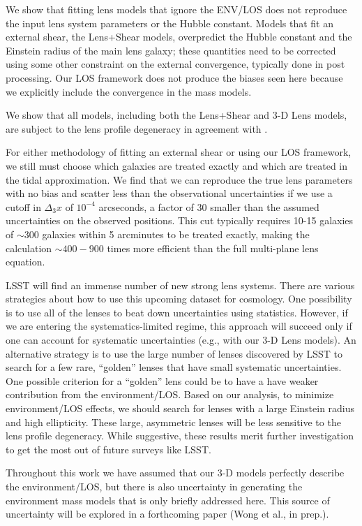 \documentclass{emulateapj}
\begin{document}
We show that fitting lens models that ignore the ENV/LOS does not reproduce the input lens system parameters or the Hubble constant. Models that fit an external shear, the Lens+Shear models, overpredict the Hubble constant and the Einstein radius of the main lens galaxy; these quantities need to be corrected using some other constraint on the external convergence, typically done in post processing. Our LOS framework does not produce the biases seen here because we explicitly include the convergence in the mass models.

We show that all models, including both the Lens+Shear and 3-D Lens models, are subject to the lens profile degeneracy in agreement with \citet{Xu15,Schneider13}. 

For either methodology of fitting an external shear or using our LOS framework, we still must choose which galaxies are treated exactly and which are treated in the tidal approximation. We find that we can reproduce the true lens parameters with no bias and scatter less than the observational uncertainties if we use a cutoff in $\Delta_3 x$ of $10^{-4}$ arcseconds, a factor of 30 smaller than the assumed uncertainties on the observed positions. This cut typically requires 10-15 galaxies of $\sim 300$ galaxies within 5 arcminutes to be treated exactly, making the calculation $\sim 400-900$ times more efficient than the full multi-plane lens equation.

LSST will find an immense number of new strong lens systems. There are various strategies about how to use this upcoming dataset for cosmology. One possibility is to use all of the lenses to beat down uncertainties using statistics. However, if we are entering the systematics-limited regime, this approach will succeed only if one can account for systematic uncertainties (e.g., with our 3-D Lens models). An alternative strategy is to use the large number of lenses discovered by LSST to search for a few rare, ``golden'' lenses that have small systematic uncertainties. One possible criterion for a ``golden'' lens could be to have a have weaker contribution from the environment/LOS. Based on our analysis, to minimize environment/LOS effects, we should search for lenses with a large Einstein radius and high ellipticity. These large, asymmetric lenses will be less sensitive to the lens profile degeneracy. While suggestive, these results merit further investigation to get the most out of future surveys like LSST.

Throughout this work we have assumed that our 3-D models perfectly describe the environment/LOS, but there is also uncertainty in generating the environment mass models that is only briefly addressed here. This source of uncertainty will be explored in a forthcoming paper (Wong et al., in prep.).
\end{document}
